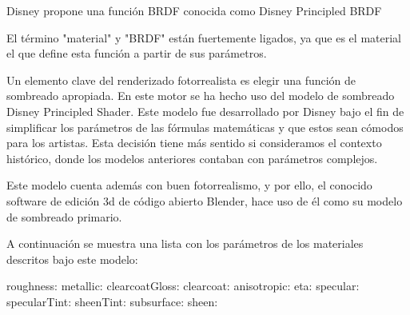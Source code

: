 	Disney propone una función BRDF conocida como Disney Principled BRDF\cite{burley2012physically}
	
	El término "material" y "BRDF" están fuertemente ligados, ya que es el material el que define esta función a partir de sus parámetros. 
		
	
	Un elemento clave del renderizado fotorrealista es elegir una función de sombreado apropiada. En este motor se ha hecho uso del modelo de sombreado Disney Principled Shader. Este modelo fue desarrollado por Disney bajo el fin de simplificar los parámetros de las fórmulas matemáticas y que estos sean cómodos para los artistas. Esta decisión tiene más sentido si consideramos el contexto histórico, donde los modelos anteriores contaban con parámetros complejos.

	Este modelo cuenta además con buen fotorrealismo, y por ello, el conocido software de edición 3d de código abierto Blender, hace uso de él como su modelo de sombreado primario.


	A continuación se muestra una lista con los parámetros de los materiales descritos bajo este modelo:

	roughness:
	metallic:
	clearcoatGloss:
	clearcoat:
	anisotropic:
	eta:
	specular:
	specularTint:
	sheenTint:
	subsurface:
	sheen:
	
